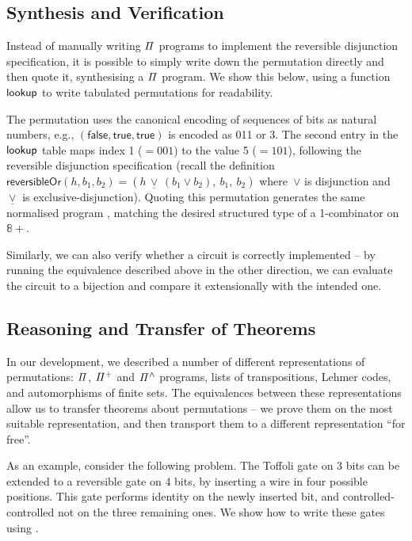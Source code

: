 \subsection{Synthesis and Verification}

Instead of manually writing $\mathit{\Pi}$ programs to implement the reversible disjunction specification, it is possible to
simply write down the permutation directly and then quote it, synthesising a $\mathit{\Pi}$ program. We show this below,
using a function $\operatorname{\mathsf{lookup}}$ to write tabulated permutations for readability.

\medskip
\resetperm{}

\noindent
The permutation uses the canonical encoding of sequences of bits as natural numbers, e.g.,
${(\mathsf{false},\mathsf{true},\mathsf{true})}$ is encoded as 011 or 3. The second entry in the $\operatorname{\mathsf{lookup}}$ table
maps index 1 (${= 001}$) to the value 5 (${= 101}$), following the reversible disjunction specification (recall the definition
$\mathsf{reversibleOr}(h,b_1,b_2) = (h \,\underline{\vee}\, (b_1 \vee b_2), ~b_1, ~b_2)$ where~$\vee$ is disjunction
and~$\underline{\vee}$ is exclusive-disjunction). Quoting this permutation generates the same normalised program
, matching the desired structured type of a 1-combinator on $\mathbb{8}+$.

Similarly, we can also verify whether a circuit is correctly implemented -- by running the equivalence described above
in the other direction, we can evaluate the circuit to a bijection and compare it extensionally with the intended one.

\subsection{Reasoning and Transfer of Theorems}

In our development, we described a number of different representations of permutations: $\mathit{\Pi}$, $\mathit{{\Pi}^{+}}$ and
$\mathit{{\Pi}^{\wedge}}$ programs, lists of transpositions, Lehmer codes, and automorphisms of finite sets. The equivalences between
these representations allow us to transfer theorems about permutations -- we prove them on the most suitable
representation, and then transport them to a different representation ``for free''.

As an example, consider the following problem. The Toffoli gate on 3 bits can be extended to a reversible gate on 4
bits, by inserting a wire in four possible positions. This gate performs identity on the newly inserted bit, and
controlled-controlled not on the three remaining ones. We show how to write these gates using .
\medskip
\extendedToffoli{}

